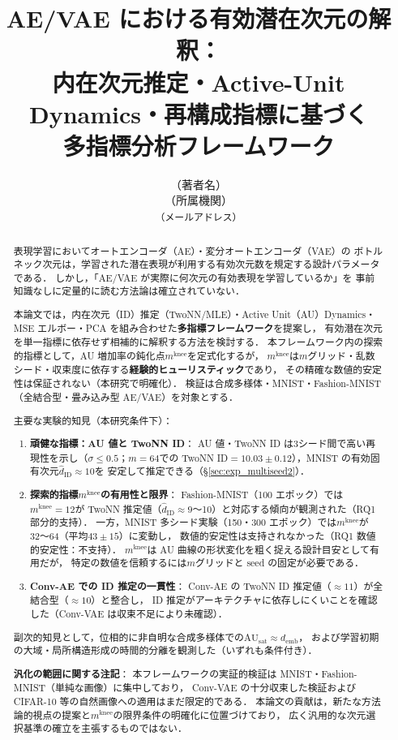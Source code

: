 \documentclass[11pt,a4paper]{jsarticle}
\title{AE/VAE における有効潜在次元の解釈：\\
       内在次元推定・Active-Unit Dynamics・再構成指標に基づく\\
       多指標分析フレームワーク}
\author{（著者名）\\
{\small （所属機関）}\\
{\small \texttt{（メールアドレス）}}}
\date{}
\newcommand{\mknee}{m^{\mathrm{knee}}}
\begin{document}
\maketitle

\begin{abstract}
表現学習においてオートエンコーダ（AE）・変分オートエンコーダ（VAE）の
ボトルネック次元は，学習された潜在表現が利用する有効次元数を規定する設計パラメータである．
しかし，「AE/VAE が実際に何次元の有効表現を学習しているか」を
事前知識なしに定量的に読む方法論は確立されていない．

本論文では，内在次元（ID）推定（TwoNN/MLE）・Active Unit（AU）Dynamics・
MSE エルボー・PCA を組み合わせた\textbf{多指標フレームワーク}を提案し，
有効潜在次元を単一指標に依存せず相補的に解釈する方法を検討する．
本フレームワーク内の探索的指標として，AU 増加率の鈍化点$m^{\mathrm{knee}}$を定式化するが，
$m^{\mathrm{knee}}$は$m$グリッド・乱数シード・収束度に依存する\textbf{経験的ヒューリスティック}であり，
その精確な数値的安定性は保証されない（本研究で明確化）．
検証は合成多様体・MNIST・Fashion-MNIST（全結合型・畳み込み型 AE/VAE）を対象とする．

主要な実験的知見（本研究条件下）：
\begin{enumerate}
  \item \textbf{頑健な指標：AU 値と TwoNN ID}：
        AU 値・TwoNN ID は3シード間で高い再現性を示し（$\sigma \leq 0.5$；$m=64$での
        TwoNN ID$= 10.03 \pm 0.12$），MNIST の有効固有次元$\hat{d}_\mathrm{ID} \approx 10$を
        安定して推定できる（§\ref{sec:exp_multiseed2}）．
  \item \textbf{探索的指標$m^{\mathrm{knee}}$の有用性と限界}：
        Fashion-MNIST（100 エポック）では$m^{\mathrm{knee}} = 12$が
        TwoNN 推定値（$\hat{d}_\mathrm{ID} \approx 9$〜10）と対応する傾向が観測された（RQ1 部分的支持）．
        一方，MNIST 多シード実験（150・300 エポック）では$\mknee$が 32〜64（平均$43 \pm 15$）に変動し，
        数値的安定性は支持されなかった（RQ1 数値的安定性：不支持）．
        $\mknee$は AU 曲線の形状変化を粗く捉える設計目安として有用だが，
        特定の数値を信頼するには$m$グリッドと seed の固定が必要である．
  \item \textbf{Conv-AE での ID 推定の一貫性}：
        Conv-AE の TwoNN ID 推定値（$\approx 11$）が全結合型（$\approx 10$）と整合し，
        ID 推定がアーキテクチャに依存しにくいことを確認した（Conv-VAE は収束不足により未確認）．
\end{enumerate}
副次的知見として，位相的に非自明な合成多様体での$\mathrm{AU}_{\mathrm{sat}} \approx d_{\mathrm{emb}}$，
および学習初期の大域・局所構造形成の時間的分離を観測した（いずれも条件付き）．

\textbf{汎化の範囲に関する注記}：
本フレームワークの実証的検証は MNIST・Fashion-MNIST（単純な画像）に集中しており，
Conv-VAE の十分収束した検証および CIFAR-10 等の自然画像への適用はまだ限定的である．
本論文の貢献は，新たな方法論的視点の提案と$\mknee$の限界条件の明確化に位置づけており，
広く汎用的な次元選択基準の確立を主張するものではない．
\end{abstract}
\end{document}
